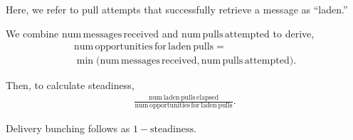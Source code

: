 Here, we refer to pull attempts that successfully retrieve a message as ``laden.''

We combine $\mathrm{num\,messages\,received}$ and $\mathrm{num\,pulls\,attempted}$ to derive,
\begin{align*}
  \mathrm{num\,opportunities\,for\,laden\,pulls} = \\
   \min\Big(\mathrm{num\,messages\,received}, \mathrm{num\,pulls\,attempted}\Big).
\end{align*}

Then, to calculate steadiness,
\begin{align*}
  \frac{
    \mathrm{num\,laden\,pulls\,elapsed}
  }{
    \mathrm{num\,opportunities\,for\,laden\,pulls}
  }.
\end{align*}

Delivery bunching follows as $1 - \mathrm{steadiness}$.
